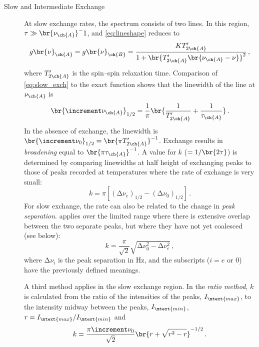\begin{description}
	\item[Slow and Intermediate Exchange] 
At slow exchange rates, the spectrum consists of two lines. 
In this region, \( \tau \gg \br{\nu_{\ch{A}}}^-1 \), and \cref{eq:lineshape} reduces to 
\begin{equation}
  g\br{\nu}_{\ch{A}} = g\br{\nu}_{\ch{B}} = \frac{K T'_{2\ch{A}}}{1 + \br{T'_{2\ch{A}} \br{\nu_{\ch{A}} - \nu}}^2} \, ,
  \label{eq:slow_exch_peak}
\end{equation}
where \( T'_{2\ch{A}} \) is the spin--spin relaxation time. 
Comparison of \cref{eq:slow_exch} to the exact function shows that the linewidth of the line at \( \nu_{\ch{A}} \) is
\begin{equation}
  \br{\increment \nu_{\ch{A}}}_{1/2} = \frac{1}{\pi} \br{\frac{1}{T'_{2\ch{A}}} + \frac{1}{\tau_{\ch{A}}}} \, .
  \label{eq:slow_exch_width}
\end{equation}
In the absence of exchange, the linewidth is \( \br{\increment \nu_0}_{1/2} = \br{\pi T'_{2\ch{A}}}^{-1} \). 
Exchange results in \emph{broadening} equal to \( \br{\pi \tau_{\ch{A}}}^{-1} \). 
A value for \( k \) (\( =1/\br{2\tau} \)) is determined by comparing linewidths at half height of exchanging peaks to those of peaks recorded at temperatures where the rate of exchange is very small:
\begin{equation}
  k = \pi [(\increment \nu_e)_{1/2} - (\increment \nu_0)_{1/2}] \, .
  \label{eq:slow_exch_k_1}
\end{equation}
For slow exchange, the rate can also be related to the change in \emph{peak separation}. 
 applies over the limited range where there is extensive overlap between the two separate peaks, but where they have not yet coalesced (see below):
\begin{equation}
  k = \frac{\pi}{\sqrt{2}} \sqrt{\increment \nu_0^2 - \increment \nu_e^2} \, ,
  \label{eq:slow_exch_k_2}
\end{equation}
where \( \increment\nu_i \) is the peak separation in \si{\Hz}, and the subscripts (\( i = e \) or \num{0}) have the previously defined meanings.

A third method applies in the slow exchange region. 
In the \emph{ratio method}, \( k \) is calculated from the ratio of the intensities of the peaks, \( I_\mtext{max} \), to the intensity midway between the peaks, \( I_\mtext{min} \), \( r = I_\mtext{max} / I_\mtext{min} \) and 
\begin{equation}
  k = \frac{\pi \increment \nu_0}{\sqrt{2}} \br{ r + \sqrt{ r^2 - r}}^{-1/2} \, .
  \label{eq:slow_exch_k_3}
\end{equation}


\end{description}
